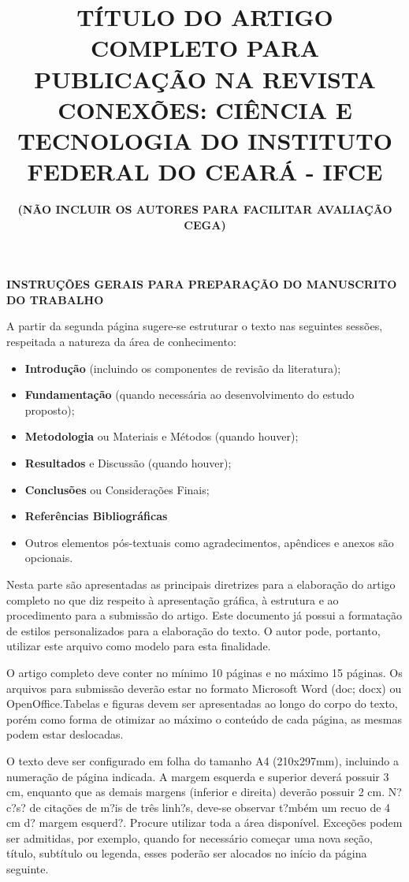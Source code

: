 \documentclass[10pt,brazil,english]{article}
\title{TÍTULO DO ARTIGO COMPLETO PARA PUBLICAÇÃO NA REVISTA CONEXÕES: CIÊNCIA E TECNOLOGIA DO INSTITUTO FEDERAL DO CEARÁ - IFCE}
\author{\textbf{(NÃO INCLUIR OS AUTORES PARA FACILITAR AVALIAÇÃO CEGA)}
}
\begin{document}
\pagestyle{fancy} %

\maketitle
\onecolumn
\begin{center}
\textbf{INSTRUÇÕES GERAIS PARA PREPARAÇÃO DO MANUSCRITO DO TRABALHO}
\end{center}


A partir da segunda página sugere-se estruturar o texto nas seguintes sessões, respeitada a natureza da área de conhecimento:

\begin{itemize}
\item \textbf{Introdução} (incluindo os componentes de revisão da literatura);
\item	\textbf{Fundamentação} (quando necessária ao desenvolvimento do estudo proposto);
\item	\textbf{Metodologia} ou Materiais e Métodos (quando houver);
\item	\textbf{Resultados} e Discussão (quando houver);
\item	\textbf{Conclusões} ou Considerações Finais;
\item	\textbf{Referências Bibliográficas}
\item	Outros elementos pós-textuais como agradecimentos, apêndices e anexos são opcionais.

\end{itemize}

Nesta parte são apresentadas as principais diretrizes para a elaboração do artigo completo no que diz respeito à apresentação gráfica, à estrutura e ao procedimento para a submissão do artigo. Este documento já possui a formatação de estilos personalizados para a elaboração do texto. O autor pode, portanto, utilizar este arquivo como modelo para esta finalidade.

O artigo completo deve conter no mínimo 10 páginas e no máximo 15 páginas. Os arquivos para submissão deverão estar no formato Microsoft Word (doc; docx) ou OpenOffice.Tabelas e figuras devem ser apresentadas ao longo do corpo do texto, porém como forma de otimizar ao máximo o conteúdo de cada página, as mesmas podem estar deslocadas.

O texto deve ser configurado em folha do tamanho A4 (210x297mm), incluindo a numeração de página indicada. A margem esquerda e superior deverá possuir 3 cm, enquanto que as demais margens (inferior e direita) deverão possuir 2 cm. N? c?s? de citações de m?is de três linh?s, deve-se observar t?mbém um recuo de 4 cm d? margem esquerd?. Procure utilizar toda a área disponível. Exceções podem ser admitidas, por exemplo, quando for necessário começar uma nova seção, título, subtítulo ou legenda, esses poderão ser alocados no início da página seguinte.
\end{document}
